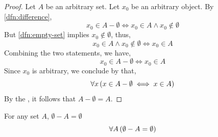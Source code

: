 \begin{proof}
    Let \( A \) be an arbitrary set. Let \( x_{0} \) be an arbitrary object. By \cref{dfn:difference},
    \begin{equation*}
        x_{0} \in A - \emptyset \iff x_{0} \in A \land x_{0} \notin \emptyset
    \end{equation*}
    But \cref{dfn:empty-set} implies \( x_{0} \notin \emptyset \), thus,
    \begin{equation*}
        x_{0} \in A \land x_{0} \notin \emptyset \iff x_{0} \in A
    \end{equation*}
    Combining the two statements, we have,
    \begin{equation*}
        x_{0} \in A - \emptyset \iff x_{0} \in A
    \end{equation*}
    Since \( x_{0} \) is arbitrary, we conclude by  that,
    \begin{equation*}
        \forall x \, \mleft( x \in A - \emptyset \iff x \in A \mright)
    \end{equation*}
    By the , it follows that \( A - \emptyset = A \).
\end{proof}

\begin{thm}
    \label{set-identities:subtracting-any-set-from-empty-set-is-still-empty}
    For any set \( A \), \( \emptyset - A = \emptyset \)
    \begin{equation*}
        \forall A \, \mleft( \emptyset - A = \emptyset \mright)
    \end{equation*}
\end{thm}

